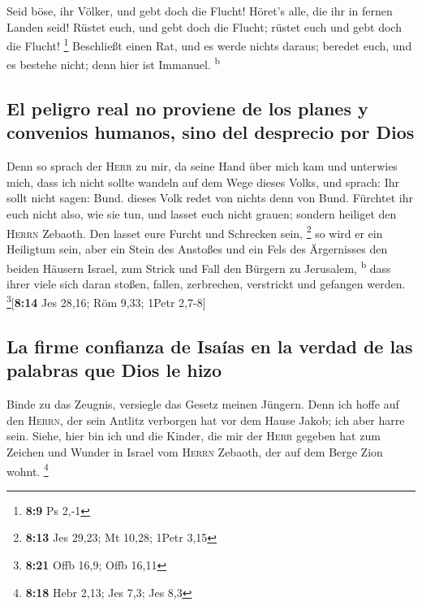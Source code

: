  Seid böse, ihr Völker, und gebt doch die Flucht! Höret's
alle, die ihr in fernen Landen seid! Rüstet euch, und gebt doch die
Flucht; rüstet euch und gebt doch die Flucht! \footnote{\textbf{8:9} Ps
  2,-1}  Beschließt einen Rat, und es werde nichts
daraus; beredet euch, und es bestehe nicht; denn hier ist Immanuel.
\textsuperscript{b}

\hypertarget{el-peligro-real-no-proviene-de-los-planes-y-convenios-humanos-sino-del-desprecio-por-dios}{%
\subsection{El peligro real no proviene de los planes y convenios
humanos, sino del desprecio por
Dios}\label{el-peligro-real-no-proviene-de-los-planes-y-convenios-humanos-sino-del-desprecio-por-dios}}

 Denn so sprach der \textsc{Herr} zu mir, da seine Hand
über mich kam und unterwies mich, dass ich nicht sollte wandeln auf dem
Wege dieses Volks, und sprach:  Ihr sollt nicht sagen:
Bund. dieses Volk redet von nichts denn von Bund. Fürchtet ihr euch
nicht also, wie sie tun, und lasset euch nicht grauen; 
sondern heiliget den \textsc{Herrn} Zebaoth. Den lasset eure Furcht und
Schrecken sein, \footnote{\textbf{8:13} Jes 29,23; Mt 10,28; 1Petr 3,15}
 so wird er ein Heiligtum sein, aber ein Stein des
Anstoßes und ein Fels des Ärgernisses den beiden Häusern Israel, zum
Strick und Fall den Bürgern zu Jerusalem, \textsuperscript{b}
 dass ihrer viele sich daran stoßen, fallen, zerbrechen,
verstrickt und gefangen werden. \footnote{\textbf{8:21} Offb 16,9; Offb
  16,11}{[}\textbf{8:14} Jes 28,16; Röm 9,33; 1Petr 2,7-8{]}

\hypertarget{la-firme-confianza-de-isauxedas-en-la-verdad-de-las-palabras-que-dios-le-hizo}{%
\subsection{La firme confianza de Isaías en la verdad de las palabras
que Dios le
hizo}\label{la-firme-confianza-de-isauxedas-en-la-verdad-de-las-palabras-que-dios-le-hizo}}

 Binde zu das Zeugnis, versiegle das Gesetz meinen
Jüngern.  Denn ich hoffe auf den \textsc{Herrn}, der sein
Antlitz verborgen hat vor dem Hause Jakob; ich aber harre sein.
 Siehe, hier bin ich und die Kinder, die mir der
\textsc{Herr} gegeben hat zum Zeichen und Wunder in Israel vom
\textsc{Herrn} Zebaoth, der auf dem Berge Zion wohnt. \footnote{\textbf{8:18}
  Hebr 2,13; Jes 7,3; Jes 8,3}


